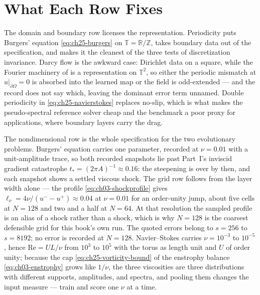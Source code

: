 \section{What Each Row Fixes}
\label{sec:appc-rows}

The domain and boundary row licenses the representation. Periodicity puts Burgers'
equation \eqref{eq:ch25-burgers} on $\mathbb{T} = \mathbb{R}/\mathbb{Z}$, takes boundary
data out of the specification, and makes it the cleanest of the three tests of
discretization invariance. Darcy flow is the awkward case: Dirichlet data on a square, while
the Fourier machinery of  is a
representation on $\mathbb{T}^{2}$, so either the periodic mismatch at
$u|_{\partial\Omega} = 0$ is absorbed into the learned map or the field is odd-extended --- and
the record does not say which, leaving the dominant error term unnamed. Double periodicity
in \eqref{eq:ch25-navierstokes} replaces no-slip, which is what makes the pseudo-spectral
reference solver cheap and the benchmark a poor proxy for applications, where boundary
layers carry the drag.

The nondimensional row is the whole specification for the two evolutionary problems.
Burgers' equation carries one parameter, recorded at $\nu = 0.01$ with a unit-amplitude
trace, so both recorded snapshots lie past Part~I's inviscid gradient catastrophe
$t_{*} = (2\pi A)^{-1} \approx 0.16$: the steepening is over by then, and each snapshot
shows a settled viscous shock. The grid row follows from the layer width alone --- the
profile \eqref{eq:ch03-shockprofile} gives $\ell_{\nu} = 4\nu/(u^{-} - u^{+}) \approx 0.04$
at $\nu = 0.01$ for an order-unity jump, about five cells at $N = 128$ and two and a half at
$N = 64$. At that resolution the sampled profile is an alias of a shock rather than a
shock, which is why $N = 128$ is the coarsest defensible grid for this book's own run. The
quoted errors belong to $s = 256$ to $s = 8192$; no error is recorded at $N = 128$. Navier--Stokes
carries $\nu = 10^{-3}$ to $10^{-5}$, hence $\mathrm{Re} = UL/\nu$ from $10^{3}$ to $10^{5}$
with the torus as length unit and $U$ of order unity; because the cap
\eqref{eq:ch25-vorticity-bound} of the enstrophy balance \eqref{eq:ch03-enstrophy} grows
like $1/\nu$, the three viscosities are three distributions with different supports,
amplitudes, and spectra, and pooling them changes the input measure --- train and score one
$\nu$ at a time.

